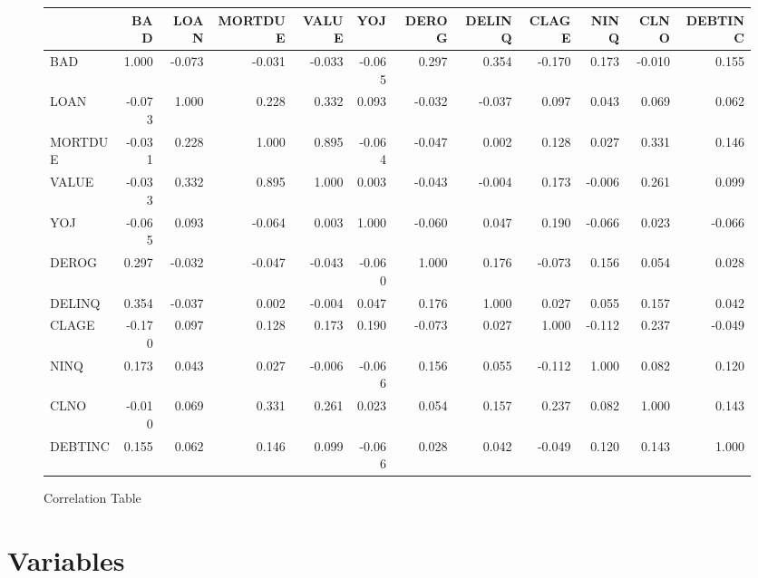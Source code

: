 \begin{landscape}
\begin{figure}[ht]
	\centering
	\renewcommand{\arraystretch}{2}
	\begin{tabular}{lrrrrrrrrrrr}
		\toprule
		{} &    BAD &   LOAN &  MORTDUE &  VALUE &    YOJ &  DEROG &  DELINQ &  CLAGE &   NINQ &   CLNO &  DEBTINC \\
		\midrule
		BAD     &  1.000 & -0.073 &   -0.031 & -0.033 & -0.065 &  0.297 &   0.354 & -0.170 &  0.173 & -0.010 &    0.155 \\
		LOAN    & -0.073 &  1.000 &    0.228 &  0.332 &  0.093 & -0.032 &  -0.037 &  0.097 &  0.043 &  0.069 &    0.062 \\
		MORTDUE & -0.031 &  0.228 &    1.000 &  0.895 & -0.064 & -0.047 &   0.002 &  0.128 &  0.027 &  0.331 &    0.146 \\
		VALUE   & -0.033 &  0.332 &    0.895 &  1.000 &  0.003 & -0.043 &  -0.004 &  0.173 & -0.006 &  0.261 &    0.099 \\
		YOJ     & -0.065 &  0.093 &   -0.064 &  0.003 &  1.000 & -0.060 &   0.047 &  0.190 & -0.066 &  0.023 &   -0.066 \\
		DEROG   &  0.297 & -0.032 &   -0.047 & -0.043 & -0.060 &  1.000 &   0.176 & -0.073 &  0.156 &  0.054 &    0.028 \\
		DELINQ  &  0.354 & -0.037 &    0.002 & -0.004 &  0.047 &  0.176 &   1.000 &  0.027 &  0.055 &  0.157 &    0.042 \\
		CLAGE   & -0.170 &  0.097 &    0.128 &  0.173 &  0.190 & -0.073 &   0.027 &  1.000 & -0.112 &  0.237 &   -0.049 \\
		NINQ    &  0.173 &  0.043 &    0.027 & -0.006 & -0.066 &  0.156 &   0.055 & -0.112 &  1.000 &  0.082 &    0.120 \\
		CLNO    & -0.010 &  0.069 &    0.331 &  0.261 &  0.023 &  0.054 &   0.157 &  0.237 &  0.082 &  1.000 &    0.143 \\
		DEBTINC &  0.155 &  0.062 &    0.146 &  0.099 & -0.066 &  0.028 &   0.042 & -0.049 &  0.120 &  0.143 &    1.000 \\
		\bottomrule
	\end{tabular}
	\caption{Correlation Table \label{CORR_TBL}}
\end{figure}
\end{landscape}

\section{Variables}

